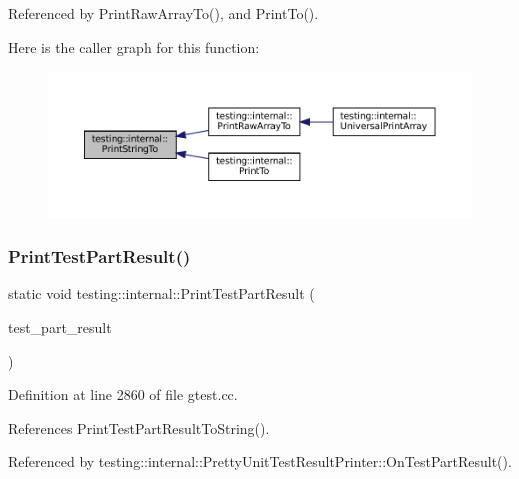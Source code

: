 Referenced by Print\+Raw\+Array\+To(), and Print\+To().

Here is the caller graph for this function\+:
\nopagebreak
\begin{figure}[H]
\begin{center}
\leavevmode
\includegraphics[width=350pt]{namespacetesting_1_1internal_a8b53e46cea3f8bdfc9342057c4f6ba62_icgraph}
\end{center}
\end{figure}
\mbox{\label{namespacetesting_1_1internal_ac844b3d05dd6f665f72e2a1cec1872ba}} 
\subsubsection{\texorpdfstring{Print\+Test\+Part\+Result()}{PrintTestPartResult()}}
{\footnotesize\ttfamily static void testing\+::internal\+::\+Print\+Test\+Part\+Result (\begin{DoxyParamCaption}\item[{const \hyperlink{classtesting_1_1TestPartResult}{Test\+Part\+Result} \&}]{test\+\_\+part\+\_\+result }\end{DoxyParamCaption})\hspace{0.3cm}{\ttfamily [static]}}



Definition at line 2860 of file gtest.\+cc.



References Print\+Test\+Part\+Result\+To\+String().



Referenced by testing\+::internal\+::\+Pretty\+Unit\+Test\+Result\+Printer\+::\+On\+Test\+Part\+Result().


